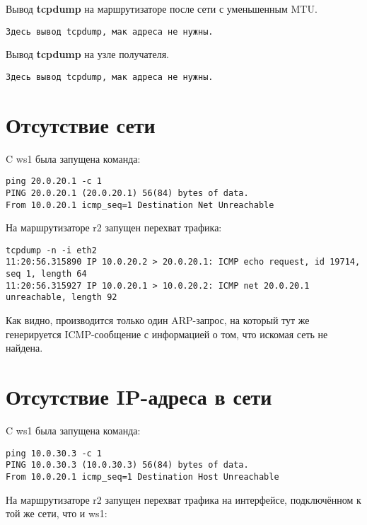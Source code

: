 \documentclass[a4paper,12pt]{article}
\begin{document}
Вывод \textbf{tcpdump} на маршрутизаторе после сети с уменьшенным MTU.


\begin{Verbatim}
Здесь вывод tcpdump, мак адреса не нужны.
\end{Verbatim}


Вывод \textbf{tcpdump} на узле получателя.

\begin{Verbatim}
Здесь вывод tcpdump, мак адреса не нужны.
\end{Verbatim}


\section{Отсутствие сети}

C ws1 была запущена команда:

\begin{Verbatim}
ping 20.0.20.1 -c 1
PING 20.0.20.1 (20.0.20.1) 56(84) bytes of data.
From 10.0.20.1 icmp_seq=1 Destination Net Unreachable
\end{Verbatim}


 На маршрутизаторе r2 запущен перехват трафика:

\begin{Verbatim}
tcpdump -n -i eth2
11:20:56.315890 IP 10.0.20.2 > 20.0.20.1: ICMP echo request, id 19714, seq 1, length 64
11:20:56.315927 IP 10.0.20.1 > 10.0.20.2: ICMP net 20.0.20.1 unreachable, length 92
\end{Verbatim}

Как видно, производится только один ARP-запрос, на который тут же генерируется ICMP-сообщение с информацией о том, что искомая сеть не найдена.

\section{Отсутствие IP-адреса в сети}

C ws1 была запущена команда:

\begin{Verbatim}
ping 10.0.30.3 -c 1
PING 10.0.30.3 (10.0.30.3) 56(84) bytes of data.
From 10.0.20.1 icmp_seq=1 Destination Host Unreachable
\end{Verbatim}


На маршрутизаторе r2 запущен перехват трафика на интерфейсе, подключённом к той же сети, что и ws1:
\end{document}
